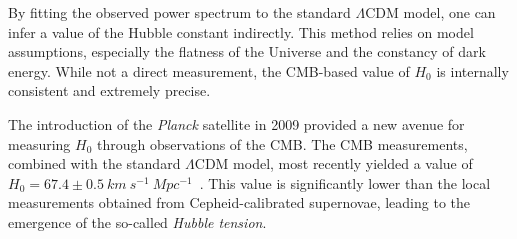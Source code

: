 By fitting the observed power spectrum to the standard $\Lambda$CDM model, one can infer a value of the Hubble constant indirectly. This method relies on model assumptions, especially the flatness of the Universe and the constancy of dark energy. While not a direct measurement, the \ac{CMB}-based value of $H_0$ is internally consistent and extremely precise.

The introduction of the \textit{Planck} satellite in 2009 provided a new avenue for measuring $H_0$ through observations of the \ac{CMB}. The \ac{CMB} measurements, combined with the standard $\Lambda$CDM model, most recently yielded a value of $H_0 = 67.4 \pm 0.5~km~s^{-1}~Mpc^{-1}$~\citep{Planck:2018vyg}. This value is significantly lower than the local measurements obtained from Cepheid-calibrated supernovae, leading to the emergence of the so-called \textit{Hubble tension}.

